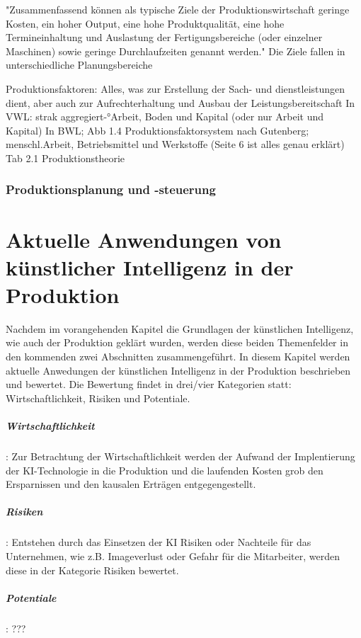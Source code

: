 \documentclass[a4paper,12pt, german]{report}
\begin{document}
"Zusammenfassend können als typische Ziele der Produktionswirtschaft geringe Kosten,
ein hoher Output, eine hohe Produktqualität, eine hohe Termineinhaltung und Auslastung
der Fertigungsbereiche (oder einzelner Maschinen) sowie geringe Durchlaufzeiten
genannt werden." Die Ziele fallen in unterschiedliche Planungsbereiche

Produktionsfaktoren: 
Alles, was zur Erstellung der Sach- und dienstleistungen dient, aber auch zur Aufrechterhaltung und Ausbau der Leistungsbereitschaft
In VWL: strak aggregiert-°Arbeit, Boden und Kapital (oder nur Arbeit und Kapital)
In BWL; Abb 1.4 Produktionsfaktorsystem nach Gutenberg; menschl.Arbeit, Betriebsmittel und Werkstoffe (Seite 6 ist alles genau erklärt)
Tab 2.1 Produktionstheorie

\subsection{Produktionsplanung und -steuerung}


\chapter{Aktuelle Anwendungen von künstlicher Intelligenz in der Produktion}

Nachdem im vorangehenden Kapitel die Grundlagen der künstlichen Intelligenz, wie auch der Produktion geklärt wurden, werden diese beiden Themenfelder in den kommenden zwei Abschnitten zusammengeführt. In diesem Kapitel werden aktuelle Anwedungen der künstlichen Intelligenz in der Produktion beschrieben und bewertet. Die Bewertung findet in drei/vier Kategorien statt: Wirtschaftlichkeit, Risiken und Potentiale.

\paragraph{Wirtschaftlichkeit}:  Zur Betrachtung der Wirtschaftlichkeit werden der Aufwand der Implentierung der KI-Technologie in die Produktion und die laufenden Kosten grob den Ersparnissen und den kausalen Erträgen entgegengestellt. 
\paragraph{Risiken}: Entstehen durch das Einsetzen der KI Risiken oder Nachteile für das Unternehmen, wie z.B. Imageverlust oder Gefahr für die Mitarbeiter, werden diese in der Kategorie Risiken bewertet.
\paragraph{Potentiale}: ??? 
\end{document}
